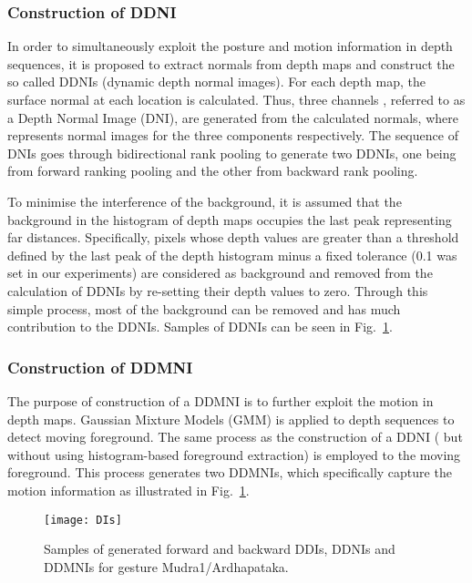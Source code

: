 \documentclass[10pt, a4paper, conference]{IEEEtran}
\begin{document}
\subsubsection{Construction of DDNI}

In order to simultaneously exploit the posture and motion information in depth sequences, it is proposed to extract normals from depth maps and construct the so called DDNIs (dynamic depth normal images). For each depth map, the surface normal  at each location is calculated. Thus, three channels , referred to as a Depth Normal Image (DNI), are generated from the calculated normals, where  represents normal images for the three components  respectively. The sequence of DNIs goes through bidirectional rank pooling to generate two DDNIs, one  being from forward ranking pooling and the other from backward rank pooling.

To minimise the interference of the background, it is assumed that the background in the histogram of depth maps occupies the last peak representing far distances. Specifically, pixels whose depth values are greater than a threshold defined by the last peak of the depth histogram minus a fixed tolerance (0.1 was set in our experiments) are considered as background and removed from the calculation of DDNIs by re-setting their depth values to zero. Through this simple process, most of the background can be removed and has much contribution to the DDNIs.  Samples of DDNIs can be seen in Fig.~\ref{fig:DIs}.

\subsubsection{Construction of DDMNI}

The purpose of construction of a DDMNI is to further exploit the motion in depth maps. Gaussian Mixture Models (GMM) is applied to depth sequences to detect moving foreground. The same process as the construction of a DDNI ( but without using histogram-based foreground extraction) is employed to the moving foreground. This process generates two DDMNIs, which specifically capture the motion information as illustrated in Fig.~\ref{fig:DIs}. 


\begin{figure}[t]
\begin{center}
{\texttt{[image: DIs]}}
\end{center}
\caption{Samples of generated forward and backward DDIs, DDNIs and DDMNIs for gesture Mudra1/Ardhapataka.}
\label{fig:DIs}
\end{figure}
\end{document}
